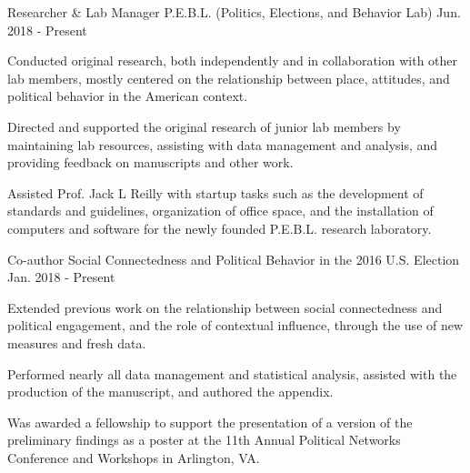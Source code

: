 

\begin{cventries}

    \cventry
      {Researcher \& Lab Manager} %
      {P.E.B.L. (Politics, Elections, and Behavior Lab)} %
      {Jun. 2018 - Present} %
      {} %
      {
        \begin{cvitems} %
          \item {Conducted original research, both independently and in collaboration with other lab members, mostly centered on the relationship between place, attitudes, and political behavior in the American context.}
          \item {Directed and supported the original research of junior lab members by maintaining lab resources, assisting with data management and analysis, and providing feedback on manuscripts and other work.}
          \item {Assisted Prof. Jack L Reilly with startup tasks such as the development of standards and guidelines, organization of office space, and the installation of computers and software for the newly founded P.E.B.L. research laboratory.}
      \end{cvitems}
      }


    \cventry
      {Co-author} %
      {Social Connectedness and Political Behavior in the 2016 U.S. Election} %
      {Jan. 2018 - Present} %
      {} %
      {
        \begin{cvitems} %
          \item {Extended previous work on the relationship between social connectedness and political engagement, and the role of contextual influence, through the use of new measures and fresh data.}
          \item {Performed nearly all data management and statistical analysis, assisted with the production of the manuscript, and authored the appendix.}
          \item {Was awarded a fellowship to support the presentation of a version of the preliminary findings as a poster at the 11th Annual Political Networks Conference and Workshops in Arlington, VA.}
        \end{cvitems}
      }



\end{cventries}
